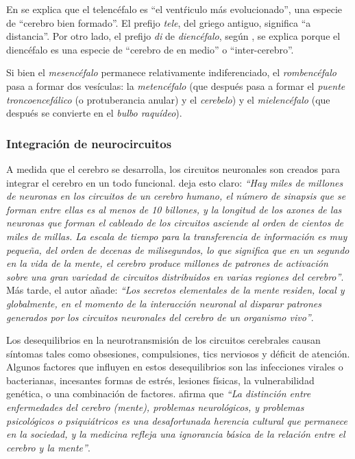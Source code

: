 En \cite{Lautin2001} se explica que el telencéfalo es ``el ventŕiculo más evolucionado'', una especie de ``cerebro bien formado''. El prefijo {\it tele}, del griego antiguo, significa ``a distancia''. Por otro lado, el prefijo {\it di} de {\it diencéfalo}, según \cite{Lautin2001}, se explica porque el diencéfalo es una especie de ``cerebro de en medio'' o ``inter-cerebro''.


Si bien el  {\it mesencéfalo} permanece relativamente indiferenciado, el  {\it rombencéfalo} pasa a formar dos vesículas: la {\it metencéfalo}  (que después pasa a formar el {\it puente troncoencefálico} (o protuberancia anular) y el {\it cerebelo}) y el  {\it mielencéfalo} (que después se convierte en el {\it bulbo raquídeo}).   

\subsubsection{Integración de neurocircuitos}

A medida que el cerebro se desarrolla, los circuitos neuronales son creados para integrar el cerebro en un todo funcional. \cite{Damasio1994} deja esto claro: {\it ``Hay miles de millones de neuronas en los circuitos de un cerebro humano, el número de sinapsis que se forman entre ellas es al menos de 10 billones, y la longitud de los axones de las neuronas que forman el cableado de los circuitos asciende al orden de cientos de miles de millas. La escala de tiempo para la transferencia de información es muy pequeña, del orden de decenas de milisegundos, lo que significa que en un segundo en la vida de la mente, el cerebro produce millones de patrones de activación sobre una gran variedad de circuitos distribuidos en varias regiones del cerebro''}. Más tarde, el autor añade: {\it ``Los secretos elementales de la mente residen, local y globalmente, en el momento de la interacción neuronal al disparar patrones generados por los circuitos neuronales del cerebro de un organismo vivo''}.

Los desequilibrios en la neurotransmisión de los circuitos cerebrales causan síntomas tales como obsesiones, compulsiones, tics nerviosos y déficit de atención. Algunos factores que influyen en estos desequilibrios son las infecciones virales o bacterianas, incesantes formas de estrés, lesiones físicas, la vulnerabilidad genética, o una combinación de factores. \cite{Damasio1994} afirma que {\it ``La distinción entre enfermedades del cerebro (mente), problemas neurológicos, y problemas psicológicos o psiquiátricos es una desafortunada herencia cultural que permanece en la sociedad, y la medicina refleja una ignorancia básica de la relación entre el cerebro y la mente''}.

